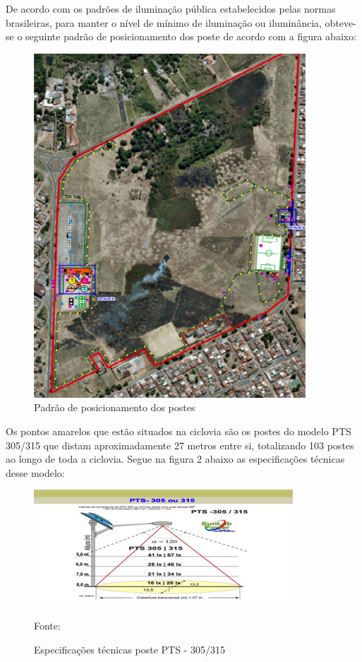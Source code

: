 De acordo com os padr\~oes de ilumina\c{c}\~ao p\'ublica estabelecidos pelas normas brasileiras, para manter o n\'ivel de m\'inimo de ilumina\c{c}\~ao ou ilumin\^ancia, obteve-se o seguinte padr\~ao de posicionamento dos poste de acordo com a figura abaixo:

\begin{figure}[h!]
	 \centering
	\label{PosicionamentoPostes}
	 \includegraphics[keepaspectratio=true,scale=0.8]{figuras/PosicionamentoPostes.png}
	 \caption{Padr\~ao de posicionamento dos postes}
\end{figure}

Os pontos amarelos que est\~ao situados na ciclovia s\~ao os postes do modelo PTS 305/315 que distam aproximadamente 27 metros entre si, totalizando 103 postes ao longo de toda a ciclovia. Segue na  figura 2 abaixo as especifica\c{c}\~oes t\'ecnicas desse modelo:

\begin{figure}[H]
	 \centering
	\label{PTS305}
	 \includegraphics[keepaspectratio=true,scale=0.8]{figuras/PTS305.png}
	 \caption{Especifica\c{c}\~oes t\'ecnicas poste PTS - 305/315}
	 \small{Fonte: \cite{SUNLABPTS}}
\end{figure}

